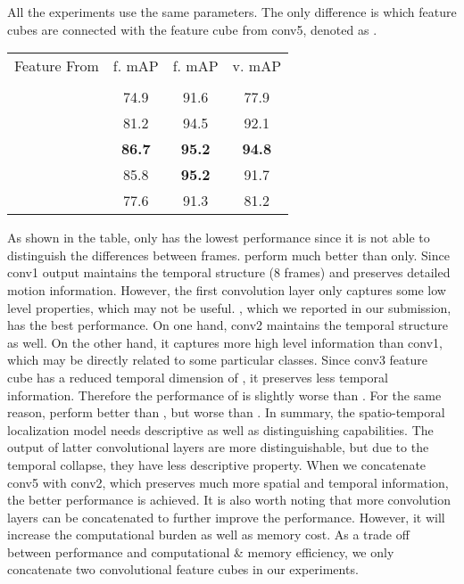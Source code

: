 \documentclass[10pt,twocolumn,letterpaper]{article}
\begin{document}
All the experiments use the same parameters. The only difference is which feature cubes are connected with the feature cube from conv5, denoted as .

\begin{table}[!hpbt]
\begin{center}
\begin{tabular}{l|c|cc}
\hline
Feature From        & f. mAP        & f. mAP        & v. mAP \\
                    & & &  \\
\hline
               & 74.9          & 91.6          & 77.9 \\
         & 81.2          & 94.5          & 92.1 \\
         & \textbf{86.7} & \textbf{95.2} & \textbf{94.8} \\
         & 85.8          & \textbf{95.2} & 91.7 \\
         & 77.6          & 91.3          & 81.2 \\
\hline
\end{tabular}
\end{center}
\end{table}

As shown in the table,  only has the lowest performance since it is not able to distinguish the differences between frames.  perform much better than  only. Since conv1 output maintains the temporal structure (8 frames) and preserves detailed motion information. However, the first convolution layer only captures some low level properties, which may not be useful. , which we reported in our submission, has the best performance. On one hand, conv2 maintains the temporal structure as well. On the other hand, it captures more high level information than conv1, which may be directly related to some particular classes. Since conv3 feature cube has a reduced temporal dimension of , it preserves less temporal information. Therefore the performance of  is slightly worse than . For the same reason,  perform better than , but worse than . In summary, the spatio-temporal localization model needs descriptive as well as distinguishing capabilities. The output of latter convolutional layers are more distinguishable, but due to the temporal collapse, they have less descriptive property. When we concatenate conv5 with conv2, which preserves much more  spatial and temporal information, the better performance is achieved. It is also worth noting that more convolution layers can be concatenated \eg  to further improve the performance. However, it will increase the computational burden as well as memory cost. As a trade off between performance and computational \& memory efficiency, we only concatenate two convolutional feature cubes in our experiments.
\end{document}
